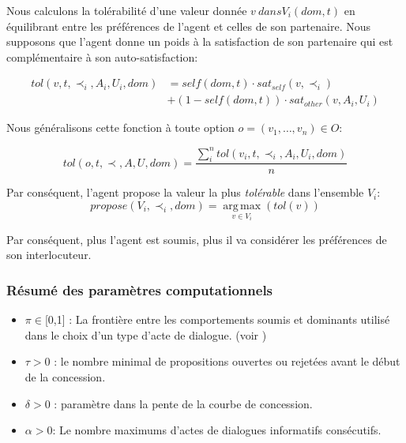 	Nous calculons la tolérabilité d'une valeur donnée $ v \ dans V_i (dom, t) $ en équilibrant entre les préférences de l'agent et celles de son partenaire. Nous supposons que l'agent donne un poids à la satisfaction de son partenaire qui est complémentaire à son auto-satisfaction:
	
	\begin{equation}
	\begin{split}
	tol(v, t, \prec_i, A_i, U_i, dom) & = self(dom, t)  \cdot sat_{self}(v, \prec_i) \\
	& +  (1 - self(dom, t)) \cdot sat_{other}(v, A_i, U_i)
	\end{split} 
	\end{equation}
	

	Nous généralisons cette fonction à toute option $o=(v_1,\ldots,v_n) \in O$:
	
	\begin{equation}
	tol(o, t, \prec, A, U, dom) = \frac{ \sum_{i}^{n} tol(v_i, t, \prec_i, A_i, U_i, dom) } {n}
	\end{equation}
	
	\noindent
	Par conséquent, l'agent propose la valeur la plus \emph{tolérable} dans l'ensemble $V_i$:
	\begin{equation}
	propose(V_i, \prec_i,dom) =  \operatorname*{arg\,max}_{v \in V_i} ( tol(v))
	\end{equation}
	
	Par conséquent, plus l'agent est soumis, plus il va considérer les préférences de son interlocuteur.
	
	\subsubsection*{Résumé des paramètres computationnels}
	\begin{itemize}[noitemsep]
		
		\item $\pi \in $[0,1] : La frontière entre  les comportements soumis et dominants utilisé dans le choix d'un type d'acte de dialogue. (voir )
		\item $\tau > 0$ : le nombre minimal de propositions ouvertes ou rejetées avant le début de la concession.
		\item $\delta > 0$ : paramètre dans la pente de la courbe de concession.
		\item $\alpha> 0$: Le nombre maximums d'actes de dialogues informatifs consécutifs.
	\end{itemize}
	
